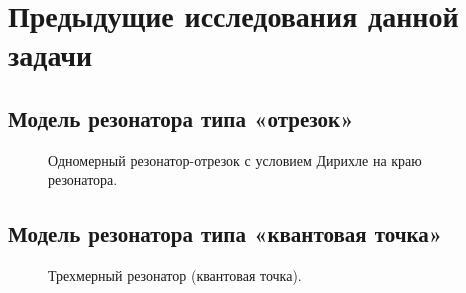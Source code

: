 \chapter{Предыдущие исследования данной задачи}\label{chap:prev_res}

\section{Модель резонатора типа «отрезок»}

\begin{figure}[!htb]
\centering
\begin{tikzpicture}[scale=1.1]

\end{tikzpicture}
\caption{Одномерный резонатор-отрезок с условием Дирихле на краю резонатора.}
\end{figure}

\section{Модель резонатора типа «квантовая точка»}

\begin{figure}[!htb]
\centering
\begin{tikzpicture}[scale=1.1]

\end{tikzpicture}
\caption{Трехмерный резонатор (квантовая точка).}
\end{figure}
